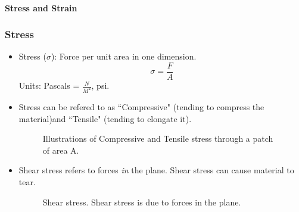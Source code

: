 \paragraph{Stress and Strain}

\subsubsection{Stress}

\begin{itemize}

\item Stress ($\sigma$):  Force per unit area in one dimension.
\[
\sigma = \frac{F}{A}
\]
Units:  Pascals = $\frac {N}{M^2}$, psi.

\item Stress can be refered to as ``Compressive" (tending to compress	%
the material)and ``Tensile" (tending to elongate it).	%

\begin{figure}[ht]	%
\begin{center}
\caption{Illustrations of Compressive and Tensile stress through a	%
 patch of area A. }	%
\end{center}
\end{figure}	%


\item Shear stress
refers to forces {\it in} the plane.  Shear stress can cause material to tear.	%
\begin{figure}[ht]	%
\begin{center}
\caption{Shear stress.  Shear stress is due to forces in the  plane. }	%
\end{center}
\end{figure}	%


\end{itemize}
